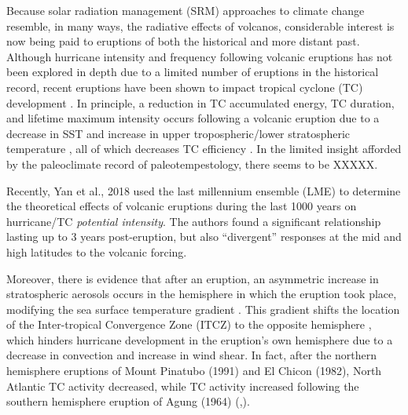 Because solar radiation management (SRM) approaches to climate change
resemble, in many ways, the radiative effects of volcanos,
considerable interest is now being paid to eruptions of both the
historical and more distant past. Although hurricane intensity and
frequency following volcanic eruptions has not been explored in depth
due to a limited number of eruptions in the historical record, recent
eruptions have been shown to impact tropical cyclone (TC) development
\cite{REF}.  In principle, a reduction in TC accumulated energy, TC
duration, and lifetime maximum intensity occurs following a volcanic
eruption due to a decrease in SST and increase in upper
tropospheric/lower stratospheric temperature \cite{volc_hurrs2}, all
of which decreases TC efficiency \cite{trop_cool}. In the limited
insight afforded by the paleoclimate record of paleotempestology,
there seems to be XXXXX.

Recently, Yan et al., 2018 used the last millennium ensemble (LME) to
determine the theoretical effects of volcanic eruptions during the
last 1000 years on hurricane/TC \textit{potential intensity}. The
authors found a significant relationship lasting up to 3 years
post-eruption, but also ``divergent'' responses at the mid and high
latitudes to the volcanic forcing.

Moreover, there is evidence that after an eruption, an asymmetric
increase in stratospheric aerosols occurs in the hemisphere in which
the eruption took place, modifying the sea surface temperature
gradient \cite{asym_forcing}.  This gradient shifts the location of
the Inter-tropical Convergence Zone (ITCZ) to the opposite hemisphere
\cite{asym_forcing}, which hinders hurricane development in the
eruption’s own hemisphere due to a decrease in convection and increase
in wind shear.  In fact, after the northern hemisphere eruptions of
Mount Pinatubo (1991) and El Chicon (1982), North Atlantic TC activity
decreased, while TC activity increased following the southern
hemisphere eruption of Agung (1964)
(\cite{volc_hurrs3},\cite{volc_hurrs2}).

